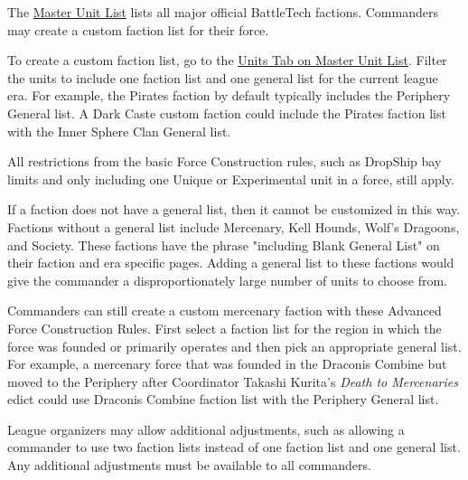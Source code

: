 The \href{http://www.masterunitlist.info/}{Master Unit List} lists all major official BattleTech factions.
Commanders may create a custom faction list for their force.

To create a custom faction list, go to the \href{http://www.masterunitlist.info/Unit/Filter}{Units Tab on Master Unit List}.
Filter the units to include one faction list and one general list for the current league era.
For example, the Pirates faction by default typically includes the Periphery General list.
A Dark Caste custom faction could include the Pirates faction list with the Inner Sphere Clan General list.

All restrictions from the basic Force Construction rules, such as DropShip bay limits and only including one Unique or Experimental unit in a force, still apply.

If a faction does not have a general list, then it cannot be customized in this way.
Factions without a general list include Mercenary, Kell Hounds, Wolf's Dragoons, and Society.
These factions have the phrase "including Blank General List" on their faction and era specific pages.
Adding a general list to these factions would give the commander a disproportionately large number of units to choose from.

Commanders can still create a custom mercenary faction with these Advanced Force Construction Rules.
First select a faction list for the region in which the force was founded or primarily operates and then pick an appropriate general list.
For example, a mercenary force that was founded in the Draconis Combine but moved to the Periphery after Coordinator Takashi Kurita's \emph{Death to Mercenaries} edict could use Draconis Combine faction list with the Periphery General list.

{
League organizers may allow additional adjustments, such as allowing a commander to use two faction lists instead of one faction list and one general list.
Any additional adjustments must be available to all commanders.
}{}
